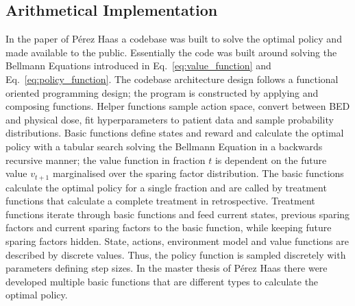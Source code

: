 \documentclass[\relativeRoot/ada.tex]{subfiles}
\begin{document}
\subsection{Arithmetical Implementation}

In the paper of Pérez Haas \cite{perezhaas_adaptive} a codebase was built to solve the optimal policy and made available to the public.  Essentially the code was built around solving the Bellmann Equations introduced in Eq.~\ref{eq:value_function} and Eq.~\ref{eq:policy_function}. The codebase architecture design follows a functional oriented programming design; the program is constructed by applying and composing functions. Helper functions sample action space, convert between BED and physical dose, fit hyperparameters to patient data and sample probability distributions. Basic functions define states and reward and calculate the optimal policy with a tabular search solving the Bellmann Equation in a backwards recursive manner; the value function  in fraction $t$ is dependent on the future value $v_{t+1}$ marginalised over the sparing factor distribution. The basic functions calculate the optimal policy for a single fraction and are called by treatment functions that calculate a complete treatment in retrospective. Treatment functions iterate through basic functions and feed current states, previous sparing factors and current sparing factors to the basic function, while keeping future sparing factors hidden. State, actions, environment model and value functions are described by discrete values. Thus, the policy function is sampled discretely with parameters defining step sizes. In the master thesis of Pérez Haas \cite{perezhaas_master} there were developed multiple basic functions that are different types to calculate the optimal policy.
\end{document}
